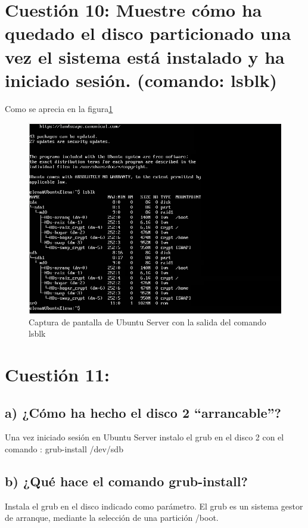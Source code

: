 \section{Cuestión 10: Muestre cómo ha quedado el disco particionado una vez el sistema está instalado y ha iniciado sesión. (comando: lsblk)}
Como se aprecia en la figura\ref{fig:figura1}
\begin{figure}[H] %
\centering
\includegraphics[scale=0.4]{img/P1-ubunturaidfunciona.png} 
\caption{Captura de pantalla de Ubuntu Server con la salida del comando lsblk} \label{fig:figura1}
\end{figure}




\section{Cuestión 11:}
\subsection{a) ¿Cómo ha hecho el disco 2 “arrancable”?}
Una vez iniciado sesión en Ubuntu Server instalo el grub en el disco 2 con el comando : grub-install /dev/sdb

\subsection{b) ¿Qué hace el comando grub-install?}
Instala el grub en el disco indicado como parámetro. El grub es un sistema gestor de arranque, mediante la selección de una
partición /boot.


